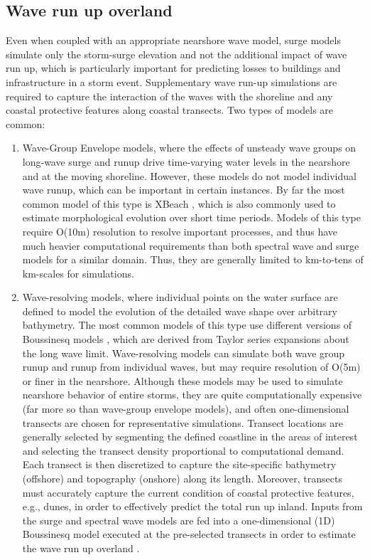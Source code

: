 \subsection{Wave run up overland}

Even when coupled with an appropriate nearshore wave model, surge models simulate only the storm-surge elevation and not the additional impact of wave run up, which is particularly important for predicting losses to buildings and infrastructure in a storm event. Supplementary wave run-up simulations are required to capture the interaction of the waves with the shoreline and any coastal protective features along coastal transects. Two types of models are common:

\begin{enumerate}
    \item Wave-Group Envelope models, where the effects of unsteady wave groups on long-wave surge and runup drive time-varying water levels in the nearshore and at the moving shoreline. However, these models do not model individual wave runup, which can be important in certain instances. By far the most common model of this type is XBeach \citep{roelvink2009modelling}, which is also commonly used to estimate morphological evolution over short time periods. Models of this type require O(10m) resolution to resolve important processes, and thus have much heavier computational requirements than both spectral wave and surge models for a similar domain. Thus, they are generally limited to km-to-tens of km-scales for simulations. 
    \item Wave-resolving models, where individual points on the water surface are defined to model the evolution of the detailed wave shape over arbitrary bathymetry. The most common models of this type use different versions of Boussinesq models \citep{lynett2002modeling,kennedy2000boussinesq,nwogu2010infragravity}, which are derived from Taylor series expansions about the long wave limit. Wave-resolving models can simulate both wave group runup and runup from individual waves, but may require resolution of O(5m) or finer in the nearshore. Although these models may be used to simulate nearshore behavior of entire storms, they are quite computationally expensive (far more so than wave-group envelope models), and often one-dimensional transects are chosen for representative simulations. Transect locations are generally selected by segmenting the defined coastline in the areas of interest and selecting the transect density proportional to computational demand. Each transect is then discretized to capture the site-specific bathymetry (offshore) and topography (onshore) along its length. Moreover, transects must accurately capture the current condition of coastal protective features, e.g., dunes, in order to effectively predict the total run up inland. Inputs from the surge and spectral wave models are fed into a one-dimensional (1D) Boussinesq model executed at the pre-selected transects in order to estimate the wave run up overland \citep{demirbilek2009wave}. 
\end{enumerate}

